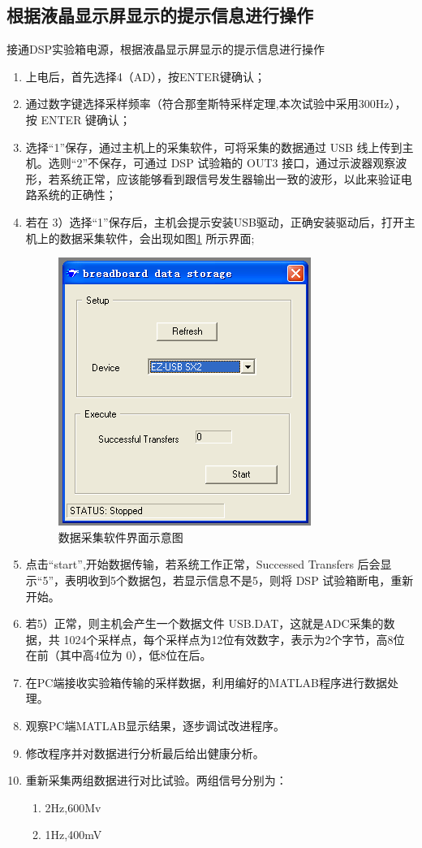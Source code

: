 \documentclass[12pt]{article}
\begin{document}
\subsection{根据液晶显示屏显示的提示信息进行操作}
接通DSP实验箱电源，根据液晶显示屏显示的提示信息进行操作
\begin{enumerate}
  \item 上电后，首先选择4（AD），按ENTER键确认；
\item 通过数字键选择采样频率（符合那奎斯特采样定理,本次试验中采用300Hz），按 ENTER 键确认；
\item 选择“1”保存，通过主机上的采集软件，可将采集的数据通过 USB 线上传到主机。选则“2”不保存，可通过 DSP 试验箱的 OUT3 接口，通过示波器观察波形，若系统正常，应该能够看到跟信号发生器输出一致的波形，以此来验证电路系统的正确性；
\item 若在 3）选择“1”保存后，主机会提示安装USB驱动，正确安装驱动后，打开主机上的数据采集软件，会出现如图\ref{sjcj}
所示界面;
\begin{figure}[htbp]
  \centering
  \includegraphics[width=.45\textwidth]{20}
  \caption{数据采集软件界面示意图}\label{sjcj}
\end{figure}
\item 点击“start”,开始数据传输，若系统工作正常，Successed Transfers 后会显示“5”，表明收到5个数据包，若显示信息不是5，则将 DSP 试验箱断电，重新开始。
\item 若5）正常，则主机会产生一个数据文件 USB.DAT，这就是ADC采集的数据，共 1024个采样点，每个采样点为12位有效数字，表示为2个字节，高8位在前（其中高4位为 0），低8位在后。
\item 在PC端接收实验箱传输的采样数据，利用编好的MATLAB程序进行数据处理。
\item 观察PC端MATLAB显示结果，逐步调试改进程序。
\item 修改程序并对数据进行分析最后给出健康分析。
\item 重新采集两组数据进行对比试验。两组信号分别为：
\begin{enumerate}[1).]
 \item  2Hz,600Mv
 \item  1Hz,400mV
\end{enumerate}
\end{enumerate}
\end{document}
